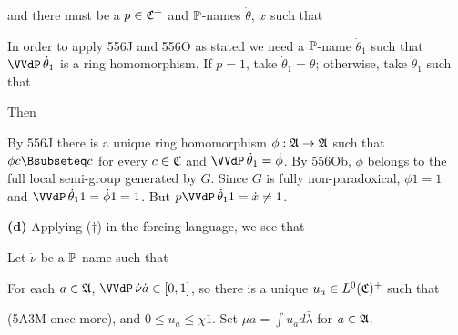 {\noindent and there must be a $p\in\frak C^+$ and $\Bbb P$-names
$\dot\theta$, $\dot x$ such that


\noindent In order to apply 556J and 556O as stated
we need a $\Bbb P$-name $\dot\theta_1$
such that $\VVdP\,\dot\theta_1$ is a ring homomorphism.
If $p=1$, take
$\dot\theta_1=\dot\theta$;  otherwise, take $\dot\theta_1$ such that


\noindent Then


\medskip

 By 556J there is a unique ring homomorphism
$\phi:\frak A\to\frak A$ such that $\phi c\Bsubseteq c$ for every
$c\in\frak C$ and $\VVdP\,\dot\theta_1=\dot\phi$.   By 556Ob, $\phi$
belongs to the full local semi-group generated by $G$.   Since $G$ is fully
non-paradoxical, $\phi 1=1$ and $\VVdP\,\dot\theta_11=\dot\phi 1=1$.
But $p\VVdP\,\dot\theta_11=\dot x\ne 1$.\ \Bang\Qed

\medskip

{\bf (d)} Applying ($\dagger$) in the forcing language, we see that


\noindent Let $\dot\nu$ be a $\Bbb P$-name such that


\noindent For each $a\in\frak A$,
$\VVdP\,\dot\nu\dot a\in[0,1]$, so there
is a unique $u_a\in L^0(\frak C)^+$ such that


\noindent (5A3M once more), and $0\le u_a\le\chi 1$.
Set $\mu a=\int u_ad\bar\lambda$ for $a\in\frak A$.

}
